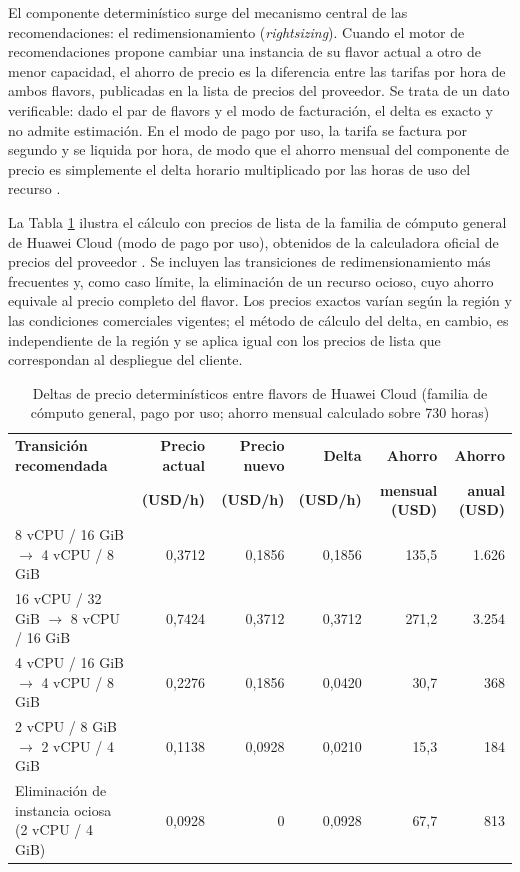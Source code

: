 El componente determinístico surge del mecanismo central de las recomendaciones: el redimensionamiento (\emph{rightsizing}). Cuando el motor de recomendaciones propone cambiar una instancia de su flavor actual a otro de menor capacidad, el ahorro de precio es la diferencia entre las tarifas por hora de ambos flavors, publicadas en la lista de precios del proveedor. Se trata de un dato verificable: dado el par de flavors y el modo de facturación, el delta es exacto y no admite estimación. En el modo de pago por uso, la tarifa se factura por segundo y se liquida por hora, de modo que el ahorro mensual del componente de precio es simplemente el delta horario multiplicado por las horas de uso del recurso \parencite{HuaweiECSPricing2026}.

La Tabla \ref{tab:delta-flavors} ilustra el cálculo con precios de lista de la familia de cómputo general de Huawei Cloud (modo de pago por uso), obtenidos de la calculadora oficial de precios del proveedor \parencite{HuaweiECSPricing2026}. Se incluyen las transiciones de redimensionamiento más frecuentes y, como caso límite, la eliminación de un recurso ocioso, cuyo ahorro equivale al precio completo del flavor. Los precios exactos varían según la región y las condiciones comerciales vigentes; el método de cálculo del delta, en cambio, es independiente de la región y se aplica igual con los precios de lista que correspondan al despliegue del cliente.

\begin{table}[H]
\centering
\scriptsize
\setlength{\tabcolsep}{4pt}
\renewcommand{\arraystretch}{1.2}
\begin{tabular}{l r r r r r}
\hline
\textbf{Transición recomendada} & \textbf{Precio actual} & \textbf{Precio nuevo} & \textbf{Delta} & \textbf{Ahorro} & \textbf{Ahorro} \\
 & \textbf{(USD/h)} & \textbf{(USD/h)} & \textbf{(USD/h)} & \textbf{mensual (USD)} & \textbf{anual (USD)} \\
\hline
8 vCPU / 16 GiB $\rightarrow$ 4 vCPU / 8 GiB & 0,3712 & 0,1856 & 0,1856 & 135,5 & 1.626 \\
16 vCPU / 32 GiB $\rightarrow$ 8 vCPU / 16 GiB & 0,7424 & 0,3712 & 0,3712 & 271,2 & 3.254 \\
4 vCPU / 16 GiB $\rightarrow$ 4 vCPU / 8 GiB & 0,2276 & 0,1856 & 0,0420 & 30,7 & 368 \\
2 vCPU / 8 GiB $\rightarrow$ 2 vCPU / 4 GiB & 0,1138 & 0,0928 & 0,0210 & 15,3 & 184 \\
Eliminación de instancia ociosa (2 vCPU / 4 GiB) & 0,0928 & 0 & 0,0928 & 67,7 & 813 \\
\hline
\end{tabular}
\caption{Deltas de precio determinísticos entre flavors de Huawei Cloud (familia de cómputo general, pago por uso; ahorro mensual calculado sobre 730 horas)}
\label{tab:delta-flavors}
\end{table}

